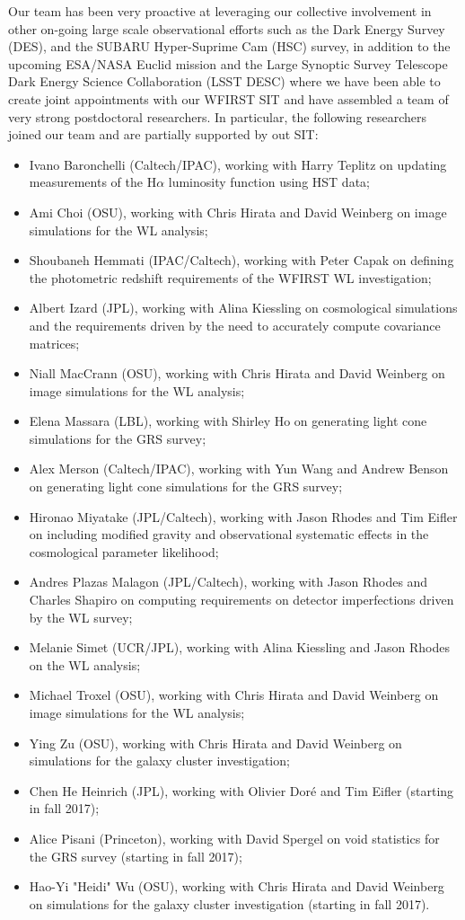 Our team has been very proactive at leveraging our collective involvement in other on-going large scale observational efforts such as the Dark Energy Survey (DES), and the SUBARU Hyper-Suprime Cam (HSC) survey, in addition to the upcoming ESA/NASA Euclid mission and the Large Synoptic Survey Telescope Dark Energy Science Collaboration (LSST DESC) where we have been able to create joint appointments with our WFIRST SIT and have assembled a team of very strong postdoctoral researchers. In particular, the following researchers joined our team and are partially supported by out SIT:
\begin{itemize}
\item Ivano Baronchelli (Caltech/IPAC), working with Harry Teplitz on updating measurements of the H$\alpha$ luminosity function using HST data;
\item Ami Choi (OSU), working with Chris Hirata and David Weinberg on image simulations for the WL analysis;
\item Shoubaneh Hemmati (IPAC/Caltech), working with Peter Capak on defining the photometric redshift requirements of the WFIRST WL investigation;
\item Albert Izard (JPL), working with Alina Kiessling on cosmological simulations and the requirements driven by the need to accurately compute covariance matrices;
\item Niall MacCrann (OSU), working with Chris Hirata and David Weinberg on image simulations for the WL analysis;
\item Elena Massara (LBL), working with Shirley Ho on generating light cone simulations for the GRS survey;
\item Alex Merson (Caltech/IPAC), working with Yun Wang and Andrew Benson on generating light cone simulations for the GRS survey;
\item Hironao Miyatake (JPL/Caltech), working with Jason Rhodes and Tim Eifler on including modified gravity and observational systematic effects in the cosmological parameter likelihood;
\item Andres Plazas Malagon (JPL/Caltech), working with Jason Rhodes and Charles Shapiro on computing requirements on detector imperfections driven by the WL survey;
\item Melanie Simet (UCR/JPL), working with Alina Kiessling and Jason Rhodes on the WL analysis;
\item Michael Troxel (OSU), working with Chris Hirata and David Weinberg on image simulations for the WL analysis;
\item Ying Zu (OSU), working with Chris Hirata and David Weinberg on simulations for the galaxy cluster investigation;
\item Chen He Heinrich (JPL), working with Olivier Dor\'e and Tim Eifler (starting in fall 2017);
\item Alice Pisani (Princeton), working with David Spergel on void statistics for the GRS survey (starting in fall 2017);
\item Hao-Yi "Heidi" Wu (OSU), working with Chris Hirata and David Weinberg on simulations for the galaxy cluster investigation (starting in fall 2017).
\end{itemize}

